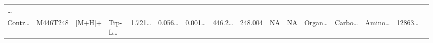 \documentclass[
]{article}
\begin{document}
\begin{longtable}[]{@{}llllllllllllllll@{}}
\begin{minipage}[t]{0.02\columnwidth}
\ldots{}\strut
\end{minipage}\tabularnewline
\begin{minipage}[t]{0.04\columnwidth}\raggedright
Contr\ldots{}\strut
\end{minipage} & \begin{minipage}[t]{0.04\columnwidth}\raggedright
M446T248\strut
\end{minipage} & \begin{minipage}[t]{0.04\columnwidth}\raggedright
{[}M+H{]}+\strut
\end{minipage} & \begin{minipage}[t]{0.04\columnwidth}\raggedright
Trp-L\ldots{}\strut
\end{minipage} & \begin{minipage}[t]{0.04\columnwidth}\raggedright
1.721\ldots{}\strut
\end{minipage} & \begin{minipage}[t]{0.04\columnwidth}\raggedright
0.056\ldots{}\strut
\end{minipage} & \begin{minipage}[t]{0.04\columnwidth}\raggedright
0.001\ldots{}\strut
\end{minipage} & \begin{minipage}[t]{0.04\columnwidth}\raggedright
446.2\ldots{}\strut
\end{minipage} & \begin{minipage}[t]{0.04\columnwidth}\raggedright
248.004\strut
\end{minipage} & \begin{minipage}[t]{0.04\columnwidth}\raggedright
NA\strut
\end{minipage} & \begin{minipage}[t]{0.03\columnwidth}\raggedright
NA\strut
\end{minipage} & \begin{minipage}[t]{0.04\columnwidth}\raggedright
Organ\ldots{}\strut
\end{minipage} & \begin{minipage}[t]{0.04\columnwidth}\raggedright
Carbo\ldots{}\strut
\end{minipage} & \begin{minipage}[t]{0.04\columnwidth}\raggedright
Amino\ldots{}\strut
\end{minipage} & \begin{minipage}[t]{0.04\columnwidth}\raggedright
12863\ldots{}\strut
\end{minipage} & \begin{minipage}[t]{0.02\columnwidth}\raggedright

\end{minipage}
\end{longtable}
\end{document}
